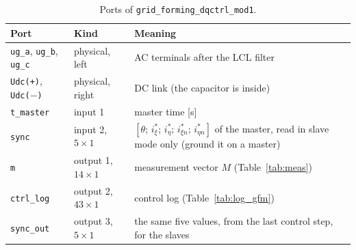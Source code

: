 \documentclass[11pt,a4paper]{scrartcl}
\newcommand{\code}[1]{\texttt{#1}}
\begin{document}
\begin{onehalfspace}
\begin{table}[H]
	\centering
	\captionsetup{width=0.9\textwidth, font=small}
	\caption[Ports of the grid-forming block.]{Ports of \code{grid\_forming\_dqctrl\_mod1}.}
	\label{tab:ports_gfm}
	\begin{tabularx}{0.95\textwidth}{@{} l l X @{}}
		\toprule
		\textbf{Port} & \textbf{Kind} & \textbf{Meaning} \\
		\midrule
		\code{ug\_a}, \code{ug\_b}, \code{ug\_c} & physical, left & AC terminals after the LCL filter \\
		\code{Udc(+)}, \code{Udc($-$)} & physical, right & DC link (the capacitor is inside) \\
		\code{t\_master} & input 1 & master time [\si{\second}] \\
		\code{sync} & input 2, $5 \times 1$ & $[\theta;\, i^{*}_\xi;\, i^{*}_\eta;\, i^{*}_{\xi n};\, i^{*}_{\eta n}]$ of the master, read in slave mode only (ground it on a master) \\
		\code{m} & output 1, $14 \times 1$ & measurement vector $M$ (Table~\ref{tab:meas}) \\
		\code{ctrl\_log} & output 2, $43 \times 1$ & control log (Table~\ref{tab:log_gfm}) \\
		\code{sync\_out} & output 3, $5 \times 1$ & the same five values, from the last control step, for the slaves \\
		\bottomrule
	\end{tabularx}
\end{table}


\end{onehalfspace}
\end{document}
